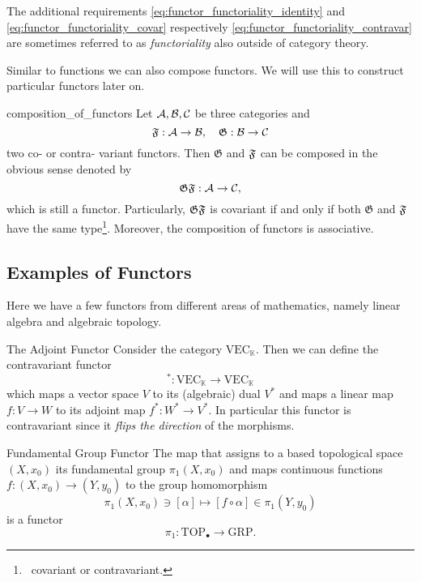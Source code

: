 The additional requirements \eqref{eq:functor_functoriality_identity} and \eqref{eq:functor_functoriality_covar} respectively \eqref{eq:functor_functoriality_contravar} are sometimes referred to as \emph{functoriality} also outside of category theory.

Similar to functions we can also compose functors. We will use this to construct particular functors later on.

\begin{defprop}{\cite[Sec.~1.3.1]{Roman2017}}{composition_of_functors}
Let $\mathcal{A}, \mathcal{B}, \mathcal{C}$ be three categories and
$$
\mathfrak{F}: \mathcal{A} \to \mathcal{B}, \quad \mathfrak{G}: \mathcal{B} \to \mathcal{C}
$$
two co- or contra- variant functors. Then $\mathfrak{G}$ and $\mathfrak{F}$ can be composed in the obvious sense denoted by
$$
\mathfrak{G} \mathfrak{F}: \mathcal{A} \to \mathcal{C},
$$
which is still a functor. Particularly, $\mathfrak{G} \mathfrak{F}$ is covariant if and only if both $\mathfrak{G}$ and $\mathfrak{F}$ have the same type\footnote{\Ie\ covariant or contravariant.}. Moreover, the composition of functors is associative.
\end{defprop}

\subsection{Examples of Functors}

Here we have a few functors from different areas of mathematics, namely linear algebra and algebraic topology.

\begin{example}{The Adjoint Functor \cite[Ex.~1.2.12]{Leinster2014-dc}}{}
Consider the category $\mathrm{VEC}_\mathbb{K}$. Then we can define the contravariant functor
$$
^* : \mathrm{VEC}_\mathbb{K} \to \mathrm{VEC}_\mathbb{K}
$$
which maps a vector space $V$ to its (algebraic) dual $V^*$ and maps a linear map $f: V \to W$ to its adjoint map $f^*: W^* \to V^*$. In particular this functor is contravariant since it \emph{flips the direction} of the morphisms.
\end{example}

\begin{example}{Fundamental Group Functor \cite[Ex.~1.2.5]{Leinster2014-dc}}{}
The map that assigns to a based topological space $(X,x_0)$ its fundamental group $\pi_1(X,x_0)$ and maps continuous functions $f: (X,x_0) \to (Y,y_0)$ to the group homomorphism 
$$
\pi_1(X,x_0) \ni [\alpha] \mapsto [f \circ \alpha] \in \pi_1(Y,y_0)
$$
is a functor
$$
\pi_1: \mathrm{TOP}_\bullet \to \mathrm{GRP}.
$$
\end{example}

